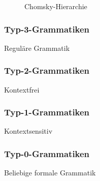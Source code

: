 \documentclass[../InterneDSLs.tex]{subfiles}
\begin{document}
\begin{figure}
\centering
\def\svgwidth{0.5\textwidth}

\caption{Chomsky-Hierarchie}
\label{FIG:Chomksky-Hierarchie}
\end{figure}

\subsubsection{Typ-3-Grammatiken}
Reguläre Grammatik

\subsubsection{Typ-2-Grammatiken}
Kontextfrei

\subsubsection{Typ-1-Grammatiken}
Kontextsensitiv

\subsubsection{Typ-0-Grammatiken}
Beliebige formale Grammatik
\end{document}
